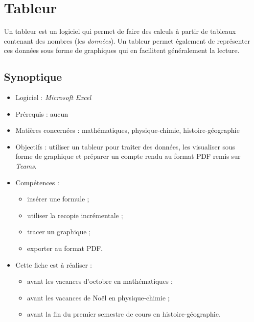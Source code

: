 \chapter{Tableur}\label{ficheTableur1}  

Un tableur est un logiciel qui permet de faire des calculs à partir de tableaux contenant des nombres (les \emph{données}). Un tableur permet également de représenter ces données sous forme de graphiques qui en facilitent généralement la lecture.\\


\section*{Synoptique}

{\footnotesize
\begin{itemize}
\item Logiciel : \emph{Microsoft Excel}
\item Prérequis : aucun
\item Matières concernées : mathématiques, physique-chimie, histoire-géographie
\item Objectifs : utiliser un tableur pour traiter des données, les visualiser sous forme de graphique et préparer un compte rendu au format PDF remis sur \emph{Teams}.
\item Compétences : 
        \begin{itemize}
        \item insérer une formule ;
        \item utiliser la recopie incrémentale ;
        \item tracer un graphique ;
        \item exporter au format PDF.
        \end{itemize}
\item Cette fiche est à réaliser :
        \begin{itemize}
        \item avant les vacances d'octobre en mathématiques ;
        \item avant les vacances de Noël en physique-chimie ;
        \item avant la fin du premier semestre de cours en histoire-géographie. 
        \end{itemize}
\end{itemize}
}


